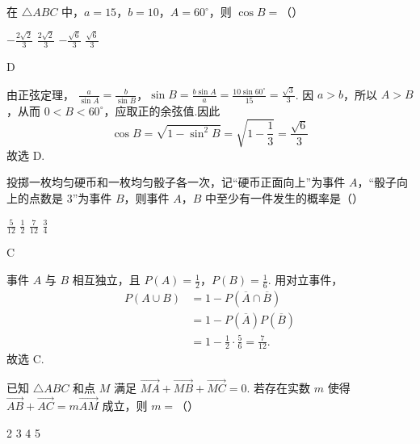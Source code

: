 \begin{problem}
在 \(\triangle ABC\) 中，\(a = 15\)，\(b = 10\)，\(A = 60^{\circ}\)，则 \(\cos B =\)（\quad）

\choices
    {\(-\frac{2\sqrt{2}}{3}\)}
    {\( \frac{2\sqrt{2}}{3} \)}
    {\(-\frac{\sqrt{6}}{3}\)}
    {\(\frac{\sqrt{6}}{3}\)}
\end{problem}

\begin{answer}
D
\end{answer}

\begin{solution}
由正弦定理，
\(\frac{a}{\sin A}=\frac{b}{\sin B}\)，\(\sin B=\frac{b\sin A}{a} =\frac{10\sin60^\circ}{15} =\frac{\sqrt3}{3}\).
因 \(a>b\)，所以 \(A>B\)，从而 \(0<B<60^\circ\)，应取正的余弦值.因此
\[
\cos B=\sqrt{1-\sin^2B}
=\sqrt{1-\frac13}
=\frac{\sqrt6}{3}
\]
故选 D.
\end{solution}

\begin{problem}
投掷一枚均匀硬币和一枚均匀骰子各一次，记“硬币正面向上”为事件 \(A\)，“骰子向上的点数是 3”为事件 \(B\)，则事件 \(A\)，\(B\) 中至少有一件发生的概率是（\quad）

\choices
    {\(\frac{5}{12}\)}
    {\(\frac{1}{2}\)}
    {\(\frac{7}{12}\)}
    {\(\frac{3}{4}\)}
\end{problem}

\begin{answer}
C
\end{answer}

\begin{solution}
事件 \(A\) 与 \(B\) 相互独立，且
\(P(A)=\frac12\)，\(P(B)=\frac16\).
用对立事件，
\[
\begin{aligned}
P(A\cup B)
&=1-P(\overline A\cap\overline B)\\
&=1-P(\overline A)P(\overline B)\\
&=1-\frac12\cdot\frac56
=\frac7{12}.
\end{aligned}
\]
故选 C.
\end{solution}

\begin{problem}
已知 \(\triangle ABC\) 和点 \(M\) 满足 \(\overrightarrow{MA} + \overrightarrow{MB} + \overrightarrow{MC} = 0\). 若存在实数 \(m\) 使得 \(\overrightarrow{AB} + \overrightarrow{AC} = m\overrightarrow{AM}\) 成立，则 \(m =\)（\quad）

\choices
    {2}
    {3}
    {4}
    {5}
\end{problem}

